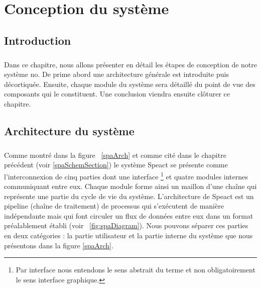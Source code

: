 \chapter{Conception du système}

\section{Introduction}
\paragraph{}
Dans ce chapitre, nous allons présenter en détail les étapes de conception de notre système no. De prime abord une architecture générale est introduite puis décortiquée. Ensuite, chaque module du système sera détaillé du point de vue des composants qui le constituent. Une conclusion viendra ensuite clôturer ce chapitre.
\section{Architecture du système}
\paragraph{}
Comme montré dans la figure ~\ref{spaArch} et comme cité dans le chapitre précédent (voir \ref{spaSchemSection}) le système Speact se présente comme l'interconnexion de cinq parties dont une interface \footnote{Par interface nous entendons le sens abstrait du terme et non obligatoirement le sens interface graphique.} et quatre modules internes communiquant entre eux. Chaque module forme ainsi un maillon d'une chaîne qui représente une partie du cycle de vie du système. L'architecture de Speact est un pipeline (chaîne de traitement) de processus qui s'exécutent de manière indépendante mais qui font circuler un flux de données entre eux dans un format préalablement établi (voir ~\ref{fig:spaDiagram}). Nous pouvons séparer ces parties en deux catégories : la partie utilisateur et la partie interne du système que nous présentons dans la figure \ref{spaArch}.

